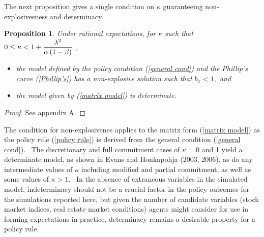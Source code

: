 \documentclass{article}
\newtheorem{proposition}{Proposition}
\begin{document}
\begin{doublespace}
The next proposition gives a single condition on $\kappa $ guaranteeing
non-explosivesness and determinacy. \ 

\begin{proposition}
Under rational expectations, for $\kappa $ such that $0\leq \kappa <1+\dfrac{%
\lambda ^{2}}{\alpha \left( 1-\beta \right) }$ ,

\begin{itemize}
\item the model defined by the policy condition (\ref{general cond}) and the
Phillip's curve (\ref{Phillip's}) has a non-explosive solution such that $%
b_{x}<1,$ and

\item the model given by (\ref{matrix model}) is determinate.
\end{itemize}
\end{proposition}

\begin{proof}
See appendix A.
\end{proof}

The condition for non-explosivenes applies to the matrix form (\ref{matrix
model}) as the policy rule (\ref{policy rule}) is derived from the general
condition (\ref{general cond}). \ The discretionary and full commitment
cases of $\kappa =0$ and 1 yield a determinate model, as shown in Evans and
 Honkapohja (2003, 2006), as do any intermediate values of $\kappa $
including modified and partial commitment, as well as some values of $\kappa
>1$. \ In the absence of extraneous variables in the simulated model,
indeterminacy should not be a crucial factor in the policy outcomes for the
simulations reported here, but given the number of candidate variables
(stock market indices, real estate market conditions) agents might consider
for use in forming expectations in practice, determinacy remains a desirable
property for a policy rule.


\end{doublespace}
\end{document}
